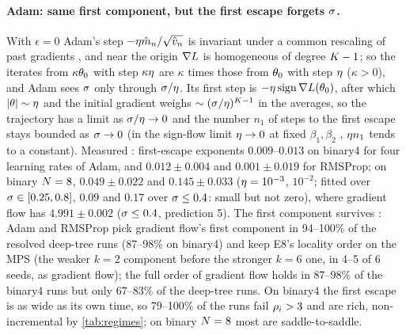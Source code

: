 \paragraph{Adam: same first component, but the first escape forgets $\sigma$.}
\derived{}  With $\epsilon=0$ Adam's step
$-\eta\hat m_n/\sqrt{\hat v_n}$ is invariant under a common rescaling of past gradients
, and near the origin $\nabla L$ is homogeneous of degree $K-1$; so the
iterates from $\kappa\theta_0$ with step $\kappa\eta$ are $\kappa$ times those from $\theta_0$ with step $\eta$ ($\kappa>0$), and Adam sees $\sigma$
only through $\sigma/\eta$. Its first step is $-\eta\,\mathrm{sign}\,\nabla L(\theta_0)$, after which $\lvert\theta\rvert\sim\eta$
and the initial gradient weighs $\sim(\sigma/\eta)^{K-1}$ in the averages, so the trajectory has a limit as
$\sigma/\eta\to0$ and the number $n_1$ of steps to the first escape stays bounded as $\sigma\to0$ (in the sign-flow limit
$\eta\to0$ at fixed $\beta_1,\beta_2$ , $\eta n_1$ tends to a constant). Measured \empirical: first-escape exponents
$0.009$--$0.013$ on binary4 for four learning rates of Adam, and $0.012\pm0.004$ and $0.001\pm0.019$ for RMSProp; on
binary $N=8$, $0.049\pm0.022$ and $0.145\pm0.033$ ($\eta=10^{-3}$, $10^{-2}$; fitted over $\sigma\in[0.25,0.8]$, $0.09$ and
$0.17$ over $\sigma\le0.4$: small but not zero), where gradient flow has $4.991\pm0.002$ ($\sigma\le0.4$, prediction 5). The
first component survives \empirical: Adam and RMSProp pick gradient flow's first component in 94--100\% of the
resolved deep-tree runs (87--98\% on binary4) and keep E8's locality order on the MPS (the weaker $k=2$ component
before the stronger $k=6$ one, in 4--5 of 6 seeds, as gradient flow); the full order of gradient flow holds in
87--98\% of the binary4 runs but only 67--83\% of the deep-tree runs. On binary4 the first escape is as wide as its
own time, so 79--100\% of the runs fail $\rho_{i}>3$ and are rich, non-incremental by \cref{tab:regimes}; on binary
$N=8$ most are saddle-to-saddle.


